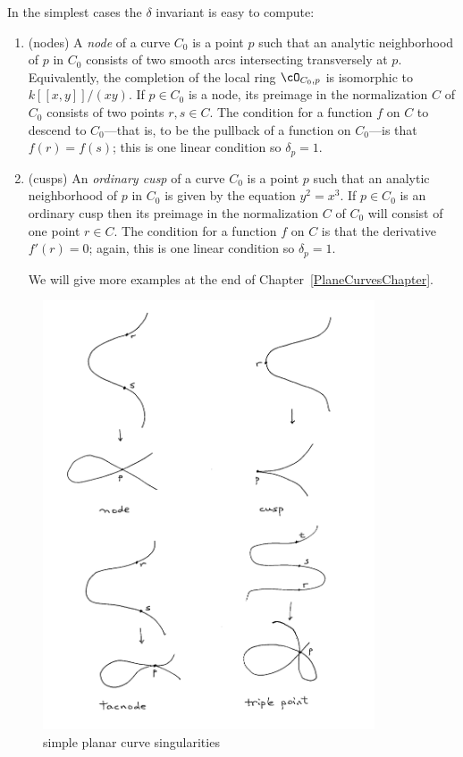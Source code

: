 In the simplest cases the $\delta$ invariant is easy to compute:


\begin{enumerate}

\item (nodes) A \emph{node} of a curve $C_0$ is a point $p$ such that an analytic neighborhood of $p$ in $C_0$ consists of two smooth arcs intersecting transversely at $p$. Equivalently, the completion of the local ring $\cO_{C_0,p}$ is isomorphic to $k[[x,y]]/(xy)$. If $p \in C_0$ is a node, its preimage in the normalization $C$ of $C_0$ consists of two points $r,s\in C$. The condition for a function $f$ on $C$ to descend to $C_0$---that is, to be the pullback of a function
on $C_0$---is  that $f(r)=f(s)$; this is one linear condition so $\delta_p = 1$.

\item (cusps) An \emph{ordinary cusp} of a curve $C_0$ is a point $p$ such that an analytic neighborhood of $p$ in $C_0$ is given by the equation $y^2=x^3$. If $p \in C_0$ is an ordinary cusp then its preimage in the normalization $C$ of $C_0$ will consist of one point $r\in C$. The condition for a function $f$ on $C$  is that the derivative $f'(r)=0$; again, this is one linear condition so $\delta_p = 1$.

We will give more examples at the end of
Chapter~\ref{PlaneCurvesChapter}.


\end{enumerate}

\begin{figure}
 \caption{simple planar curve singularities}
\centerline {\includegraphics[height=5in]{"Fig2.2"}}
\end{figure}


